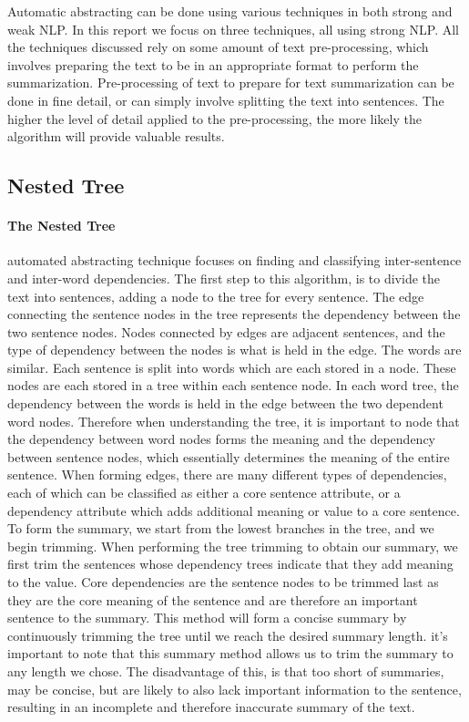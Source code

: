
Automatic abstracting can be done using various techniques in both strong and weak NLP. In this report we focus on three techniques, all using strong NLP. All the techniques discussed rely on some amount of text pre-processing, which involves preparing the text to be in an appropriate format to perform the summarization. Pre-processing of text to prepare for text summarization can be done in fine detail, or can simply involve splitting the text into sentences. The higher the level of detail applied to the pre-processing, the more likely the algorithm will provide valuable results.


\subsection{Nested Tree}

	\paragraph{The Nested Tree} automated abstracting technique focuses on finding and classifying inter-sentence and inter-word dependencies. The first step to this algorithm, is to divide the text into sentences, adding a node to the tree for every sentence. The edge connecting the sentence nodes in the tree represents the dependency between the two sentence nodes. Nodes connected by edges are adjacent sentences, and the type of dependency between the nodes is what is held in the edge. The words are similar. Each sentence is split into words which are each stored in a node. These nodes are each stored in a tree within each sentence node. In each word tree, the dependency between the words is held in the edge between the two dependent word nodes. Therefore when understanding the tree, it is important to node that the dependency between word nodes forms the meaning and the dependency between sentence nodes, which essentially determines the meaning of the entire sentence. When forming edges, there are many different types of dependencies, each of which can be classified as either a core sentence attribute, or a dependency attribute which adds additional meaning or value to a core sentence. To form the summary, we start from the lowest branches in the tree, and we begin trimming. When performing the tree trimming to obtain our summary, we first trim the sentences whose dependency trees indicate that they add meaning to the value. Core dependencies are the sentence nodes to be trimmed last as they are the core meaning of the sentence and are therefore an important sentence to the summary. This method will form a concise summary by continuously trimming the tree until we reach the desired summary length. it's important to note that this summary method allows us to trim the summary to any length we chose. The disadvantage of this, is that too short of summaries, may be concise, but are likely to also lack important information to the sentence, resulting in an incomplete and therefore inaccurate summary of the text. 


